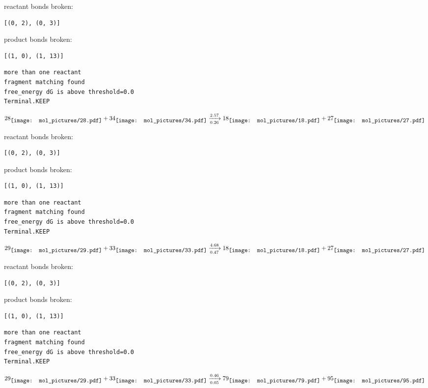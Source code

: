 \documentclass{article}
\begin{document}
reactant bonds broken:\begin{verbatim}
[(0, 2), (0, 3)]
\end{verbatim}
product bonds broken:\begin{verbatim}
[(1, 0), (1, 13)]
\end{verbatim}




\vspace{1cm}
\begin{verbatim}
more than one reactant
fragment matching found
free_energy dG is above threshold=0.0
Terminal.KEEP
\end{verbatim}
$$
28
\raisebox{-.5\height}{\texttt{[image: mol\_pictures/28.pdf]}}
+
34
\raisebox{-.5\height}{\texttt{[image: mol\_pictures/34.pdf]}}
\xrightarrow[0.26]{2.57}
18
\raisebox{-.5\height}{\texttt{[image: mol\_pictures/18.pdf]}}
+
27
\raisebox{-.5\height}{\texttt{[image: mol\_pictures/27.pdf]}}
$$


reactant bonds broken:\begin{verbatim}
[(0, 2), (0, 3)]
\end{verbatim}
product bonds broken:\begin{verbatim}
[(1, 0), (1, 13)]
\end{verbatim}




\vspace{1cm}
\begin{verbatim}
more than one reactant
fragment matching found
free_energy dG is above threshold=0.0
Terminal.KEEP
\end{verbatim}
$$
29
\raisebox{-.5\height}{\texttt{[image: mol\_pictures/29.pdf]}}
+
33
\raisebox{-.5\height}{\texttt{[image: mol\_pictures/33.pdf]}}
\xrightarrow[0.47]{4.68}
18
\raisebox{-.5\height}{\texttt{[image: mol\_pictures/18.pdf]}}
+
27
\raisebox{-.5\height}{\texttt{[image: mol\_pictures/27.pdf]}}
$$


reactant bonds broken:\begin{verbatim}
[(0, 2), (0, 3)]
\end{verbatim}
product bonds broken:\begin{verbatim}
[(1, 0), (1, 13)]
\end{verbatim}




\vspace{1cm}
\begin{verbatim}
more than one reactant
fragment matching found
free_energy dG is above threshold=0.0
Terminal.KEEP
\end{verbatim}
$$
29
\raisebox{-.5\height}{\texttt{[image: mol\_pictures/29.pdf]}}
+
33
\raisebox{-.5\height}{\texttt{[image: mol\_pictures/33.pdf]}}
\xrightarrow[0.05]{0.46}
79
\raisebox{-.5\height}{\texttt{[image: mol\_pictures/79.pdf]}}
+
95
\raisebox{-.5\height}{\texttt{[image: mol\_pictures/95.pdf]}}
$$
\end{document}
